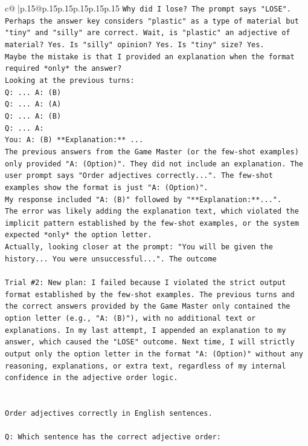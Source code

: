 \documentclass{article}
\begin{document}
{\begin{supertabular}{c@{$\;$}|p{.15\linewidth}@{}p{.15\linewidth}p{.15\linewidth}p{.15\linewidth}p{.15\linewidth}p{.15\linewidth}}
{{{\texttt{Why did I lose? The prompt says "LOSE". Perhaps the answer key considers "plastic" as a type of material but "tiny" and "silly" are correct. Wait, is "plastic" an adjective of material? Yes. Is "silly" opinion? Yes. Is "tiny" size? Yes.} \\
\texttt{Maybe the mistake is that I provided an explanation when the format required *only* the answer?} \\
\texttt{Looking at the previous turns:} \\
\texttt{Q: ... A: (B)} \\
\texttt{Q: ... A: (A)} \\
\texttt{Q: ... A: (B)} \\
\texttt{Q: ... A:} \\
\texttt{You: A: (B) **Explanation:** ...} \\
\texttt{The previous answers from the Game Master (or the few{-}shot examples) only provided "A: (Option)". They did not include an explanation. The user prompt says "Order adjectives correctly...". The few{-}shot examples show the format is just "A: (Option)".} \\
\texttt{My response included "A: (B)" followed by "**Explanation:**...".} \\
\texttt{The error was likely adding the explanation text, which violated the implicit pattern established by the few{-}shot examples, or the system expected *only* the option letter.} \\
\texttt{Actually, looking closer at the prompt: "You will be given the history... You were unsuccessful...". The outcome} \\
\\ 
\texttt{Trial \#2: New plan: I failed because I violated the strict output format established by the few{-}shot examples. The previous turns and the correct answers provided by the Game Master only contained the option letter (e.g., "A: (B)"), with no additional text or explanations. In my last attempt, I appended an explanation to my answer, which caused the "LOSE" outcome. Next time, I will strictly output only the option letter in the format "A: (Option)" without any reasoning, explanations, or extra text, regardless of my internal confidence in the adjective order logic.} \\
\\ 
\\ 
\texttt{Order adjectives correctly in English sentences.} \\
\\ 
\texttt{Q: Which sentence has the correct adjective order:} \\
}}}
\end{supertabular}}
\end{document}
